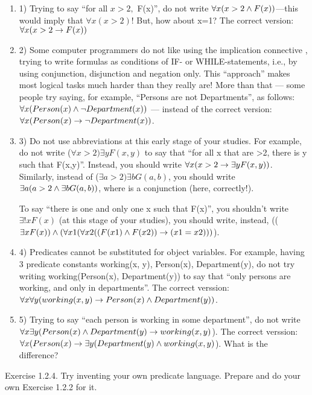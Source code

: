 \begin{enumerate}
    \item 1) Trying to say ``for all \(x>2,\) F(x)'', do not write \(\forall x(x>2\wedge F(x))\)---this would imply that \(\forall x(x>2)\)! But, how about x=1? The correct version: \(\forall x(x>2\rightarrow F(x))\)
    \item 2) Some computer programmers do not like using the implication connective \IMPLIES , trying to write formulas as conditions of IF- or WHILE-statements, i.e., by using conjunction, disjunction and negation only. This ``approach'' makes most logical tasks much harder than they really are! More than that --- some people try saying, for example, ``Persons are not Departments'', as follows: \(\forall x(Person(x)\wedge \neg Department(x))\) --- instead of the correct version: \(\forall x(Person(x)\rightarrow \neg Department(x))\).
    \item 3) Do not use abbreviations at this early stage of your studies. For example, do not write (\(\forall x>2)\exists yF(x,y)\) to say that ``for all x that are >2, there is y such that F(x,y)''. Instead, you should write \(\forall x(x>2\rightarrow \exists yF(x,y))\). Similarly, instead of (\(\exists a>2)\exists bG(a,b)\), you should write \(\exists a(a>2\wedge \exists bG(a,b))\), where \AND  is a conjunction (here, correctly!).

    To say ``there is one and only one x such that F(x)'', you shouldn't write \(\exists !x F(x)\) (at this stage of your studies), you should write, instead, ((\(\exists xF(x))\wedge (\forall x1(\forall x2((F(x1)\wedge F(x2))\rightarrow (x1=x2)))\)).

    \item 4) Predicates cannot be substituted for object variables. For example, having 3 predicate constants working(x, y), Person(x), Department(y), do not try writing working(Person(x), Department(y)) to say that ``only persons are working, and only in departments''. The correct verssion: \(\forall x\forall y(working(x, y)\rightarrow Person(x)\wedge Department(y))\).

    \item 5) Trying to say ``each person is working in some department'', do not write \(\forall x\exists y(Person(x)\wedge Department(y)\rightarrow working(x,y)\)). The correct verssion: \(\forall x(Person(x)\rightarrow \exists y(Department(y)\wedge working(x,y)\)). What is the difference?
\end{enumerate}

\begin{exercise}
Exercise 1.2.4. Try inventing your own predicate language. Prepare and do your own Exercise 1.2.2 for it.
\end{exercise}

